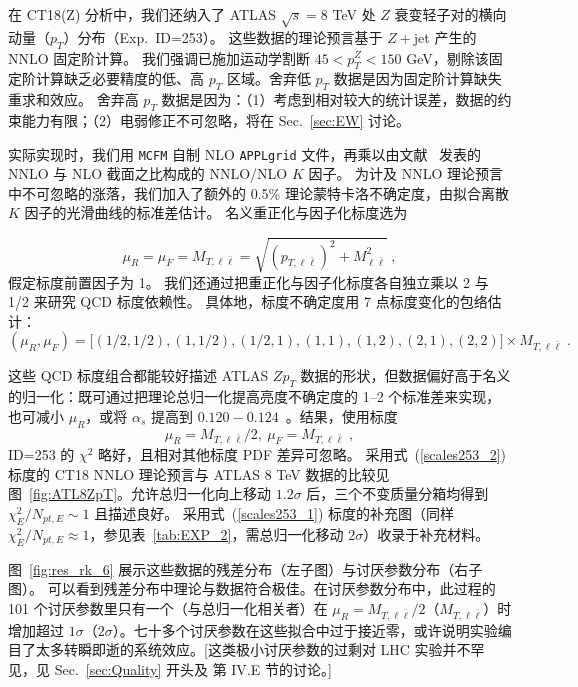 在 CT18(Z) 分析中，我们还纳入了 ATLAS $\sqrt{s}=8$ TeV 处 $Z$ 衰变轻子对的横向动量（$p_{T}$）分布（Exp.~ID=253）。
这些数据的理论预言基于 $Z+$jet 产生的 NNLO 固定阶计算。
我们强调已施加运动学割断 $45<p_T^Z<150$
GeV，剔除该固定阶计算缺乏必要精度的低、高 $p_T$ 区域。舍弃低 $p_T$ 数据是因为固定阶计算缺失重求和效应。
舍弃高 $p_T$ 数据是因为：（1）考虑到相对较大的统计误差，数据的约束能力有限；（2）电弱修正不可忽略，将在 Sec.~\ref{sec:EW} 讨论。

实际实现时，我们用 \texttt{MCFM} 自制 NLO \texttt{APPLgrid} 文件，再乘以由文献~\cite{Ridder:2015dxa,Gehrmann-DeRidder:2017mvr,Gehrmann-DeRidder:2016jns,Gehrmann-DeRidder:2016zml,Ridder:2016rzm,Ridder:2016nkl} 发表的 NNLO 与 NLO 截面之比构成的 NNLO/NLO $K$ 因子。
为计及 NNLO 理论预言中不可忽略的涨落，我们加入了额外的 0.5\% 理论蒙特卡洛不确定度，由拟合离散 $K$ 因子的光滑曲线的标准差估计。
名义重正化与因子化标度选为

\begin{equation}
\mu_{R}=\mu_{F}=M_{T, \ell \bar \ell}=\sqrt{(p_{T, \ell \bar \ell})^{2}+M_{\ell \bar \ell}^{2}}\; ,
\label{scales253_1}
\end{equation}
假定标度前置因子为 1。
我们还通过把重正化与因子化标度各自独立乘以 2 与 1/2 来研究 QCD 标度依赖性。
具体地，标度不确定度用 7 点标度变化的包络估计：
\begin{equation}
(\mu_{R},\mu_{F}) = \big[(1/2, 1/2),(1, 1/2),(1/2, 1),(1, 1),(1, 2),(2, 1),(2, 2)\big] \times M_{T, \ell \bar \ell}
\;.
\end{equation}

这些 QCD 标度组合都能较好描述 ATLAS $Z p_T$ 数据的形状，但数据偏好高于名义的归一化：既可通过把理论总归一化提高亮度不确定度的 1--2 个标准差来实现，也可减小 $\mu_R$，或将 $\alpha_s$ 提高到 $0.120-0.124$~\cite{Forte:2020pyp}。结果，使用标度
\begin{equation}
\mu_{R}=M_{T, \ell \bar \ell}/2, ~\mu_{F}=M_{T, \ell \bar \ell}\;,
\label{scales253_2}
\end{equation}
ID=253 的 $\chi^2$ 略好，且相对其他标度 PDF 差异可忽略。
采用式~(\ref{scales253_2}) 标度的 CT18 NNLO 理论预言与 ATLAS 8 TeV 数据的比较见图~\ref{fig:ATL8ZpT}。允许总归一化向上移动 $1.2\sigma$ 后，三个不变质量分箱均得到 $\chi^2_E/N_{pt,E}\sim 1$ 且描述良好。
采用式~(\ref{scales253_1}) 标度的补充图（同样 $\chi^2_E/N_{pt,E} \approx 1$，参见表~\ref{tab:EXP_2}，需总归一化移动 $2\sigma$）收录于补充材料。

图~\ref{fig:res_rk_6} 展示这些数据的残差分布（左子图）与讨厌参数分布（右子图）。
可以看到残差分布中理论与数据符合极佳。在讨厌参数分布中，此过程的 101 个讨厌参数里只有一个（与总归一化相关者）在 $\mu_R=M_{T, \ell \bar \ell}/2$（$M_{T, \ell \bar \ell}$）时增加超过 $1\sigma$（$2\sigma$）。七十多个讨厌参数在这些拟合中过于接近零，或许说明实验编目了太多转瞬即逝的系统效应。[这类极小讨厌参数的过剩对 LHC 实验并不罕见，见 Sec.~\ref{sec:Quality} 开头及 \cite{Kovarik:2019xvh} 第 IV.E 节的讨论。]



